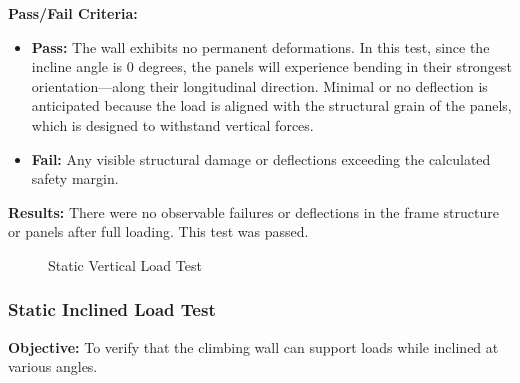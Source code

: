 \textbf{Pass/Fail Criteria:}
\begin{itemize}
    \item \textbf{Pass:} The wall exhibits no permanent deformations. In this test, since the incline angle is 0 degrees, the panels will experience bending in their strongest orientation—along their longitudinal direction. Minimal or no deflection is anticipated because the load is aligned with the structural grain of the panels, which is designed to withstand vertical forces.
    \item \textbf{Fail:} Any visible structural damage or deflections exceeding the calculated safety margin.
\end{itemize}
\noindent
\textbf{Results:} There were no observable failures or deflections in the frame structure or panels after full loading. This test was passed.


\begin{figure}[htbp]
    \centering
    \caption{Static Vertical Load Test}
    \label{fig:static_vertical_load_test}
\end{figure}

\subsubsection{Static Inclined Load Test}
\textbf{Objective:} To verify that the climbing wall can support loads while inclined at various angles.

